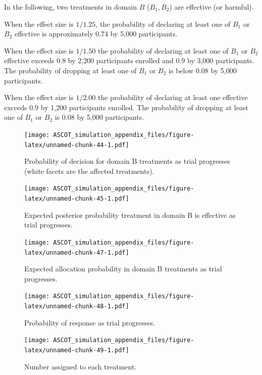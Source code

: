 \documentclass[
]{article}
\begin{document}
In the following, two treatments in domain \(B\) (\(B_1, B_2\)) are effective (or harmful).

When the effect size is \(1/1.25\), the probability of declaring at least one of \(B_1\) or \(B_2\) effective is approximately 0.74 by 5,000 participants.

When the effect size is \(1/1.50\) the probability of declaring at least one of \(B_1\) or \(B_2\) effective exceeds 0.8 by 2,200 participants enrolled and 0.9 by 3,000 participants.
The probability of dropping at least one of \(B_1\) or \(B_2\) is below 0.08 by 5,000 participants.

When the effect size is \(1/2.00\) the probability of declaring at least one effective exceeds 0.9 by 1,200 participants enrolled.
The probability of dropping at least one of \(B_1\) or \(B_2\) is 0.08 by 5,000 participants.

\begin{figure}
\centering
\texttt{[image: ASCOT\_simulation\_appendix\_files/figure-latex/unnamed-chunk-44-1.pdf]}
\caption{\label{fig:unnamed-chunk-44}Probability of decision for domain B treatments as trial progresses (white facets are the affected treatments).}
\end{figure}

\begin{figure}
\centering
\texttt{[image: ASCOT\_simulation\_appendix\_files/figure-latex/unnamed-chunk-45-1.pdf]}
\caption{\label{fig:unnamed-chunk-45}Expected posterior probability treatment in domain B is effective as trial progresses.}
\end{figure}

\begin{figure}
\centering
\texttt{[image: ASCOT\_simulation\_appendix\_files/figure-latex/unnamed-chunk-47-1.pdf]}
\caption{\label{fig:unnamed-chunk-47}Expected allocation probability in domain B treatments as trial progresses.}
\end{figure}

\begin{figure}
\centering
\texttt{[image: ASCOT\_simulation\_appendix\_files/figure-latex/unnamed-chunk-48-1.pdf]}
\caption{\label{fig:unnamed-chunk-48}Probability of response as trial progresses.}
\end{figure}

\begin{figure}
\centering
\texttt{[image: ASCOT\_simulation\_appendix\_files/figure-latex/unnamed-chunk-49-1.pdf]}
\caption{\label{fig:unnamed-chunk-49}Number assigned to each treatment.}
\end{figure}
\end{document}
